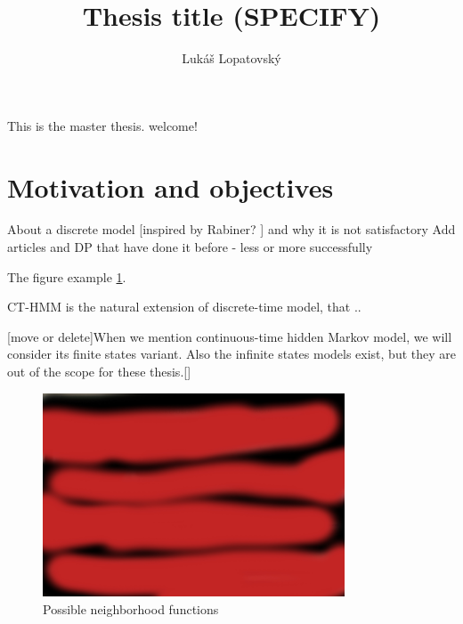 \documentclass[thesis=M,english]{FITthesis}[2012/10/20]
\title{Thesis title (SPECIFY)}
\author{Luk{\' a}{\v s} Lopatovsk{\' y}} %
\begin{document}


\begin{introduction}
	This is the master thesis. welcome!
	\section{Motivation and objectives}
	About a discrete model [inspired by Rabiner? ] and why it is not satisfactory  %
	Add articles and DP that have done it before - less or more successfully 
	
The figure example \ref{fig:gb}.

CT-HMM is the natural extension of discrete-time model, that ..

[move or delete]When we mention continuous-time hidden Markov model, we will consider its finite states variant. Also the infinite states models exist, but they are out of the scope for these thesis.[]


\begin{figure}[h]
\centering
\includegraphics[width=0.8\textwidth]{img/ps.jpg}
\caption{Possible neighborhood functions \cite{Ho03} }
\label{fig:gb}
\end{figure} 	
	
	
\end{introduction}
\end{document}
